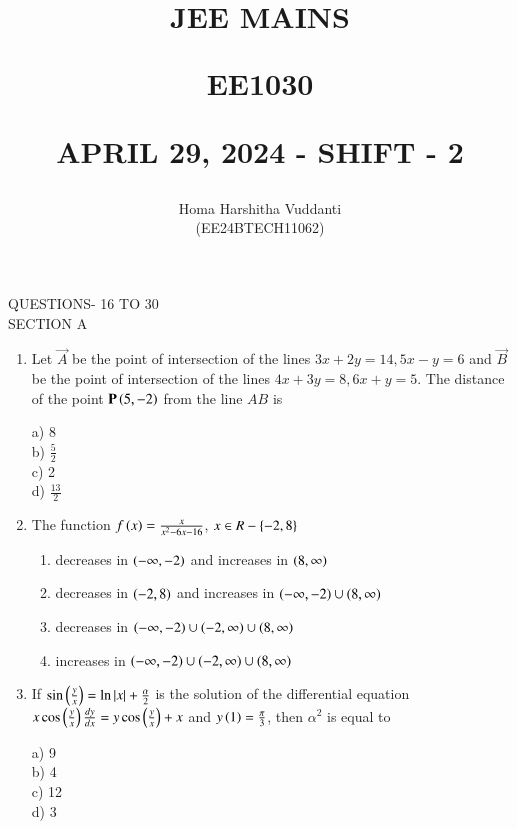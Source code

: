 \documentclass[journal]{IEEEtran}
\begin{document}


\title{
JEE MAINS

\large{EE1030}

APRIL 29, 2024 - SHIFT - 2
}
\author{Homa Harshitha Vuddanti

(EE24BTECH11062)
}	

\maketitle

\bigskip

\renewcommand{\thefigure}{\theenumi}
\renewcommand{\thetable}{\theenumi}
QUESTIONS- 16 TO 30\\
SECTION A
\begin{enumerate}
   
\item Let $\vec{A}$ be the point of intersection of the lines $3x+2y=14, 5x-y=6$ and $\vec{B}$ be the point of intersection of the lines $4x+3y=8, 6x+y=5.$ The distance of the point $\mathbf{P}\left(5,-2\right)$ from the line $AB$ is
\begin{multicols}{4}
    a) 8\\
    b) $\frac{5}{2}$\\
    c) 2\\
    d) $\frac{13}{2}$
\end{multicols}
 \item The function $f\left(x\right)=\frac{x}{x^2-6x-16}$, $x\in R-\left\{-2,8\right\}$
 \begin{enumerate}
     \item  decreases in $\left(-\infty,-2\right)$ and increases in $\left(8,\infty\right)$\\
     \item decreases in $\left(-2,8\right)$ and increases in $\left(-\infty,-2\right)\cup \left(8,\infty\right)$\\
     \item decreases in $\left(-\infty,-2\right)\cup\left(-2,\infty\right)\cup\left(8,\infty\right)$\\
     \item  increases in $\left(-\infty,-2\right)\cup\left(-2,\infty\right)\cup\left(8,\infty\right)$
 \end{enumerate}
 
 \item If $\sin\left(\frac{y}{x}\right)=\ln\left\vert x\right\vert+\frac{\alpha}{2}$ is the solution of the differential equation $x\cos\left(\frac{y}{x}\right)\frac{dy}{dx}=y\cos\left(\frac{y}{x}\right)+x$ and $y\left(1\right)=\frac{\pi}{3}$, then $\alpha^2$ is equal to
 \begin{multicols}{4}
    a) 9\\
    b) 4\\
    c) 12\\
    d) 3
 \end{multicols}
 

\end{enumerate}
\end{document}
